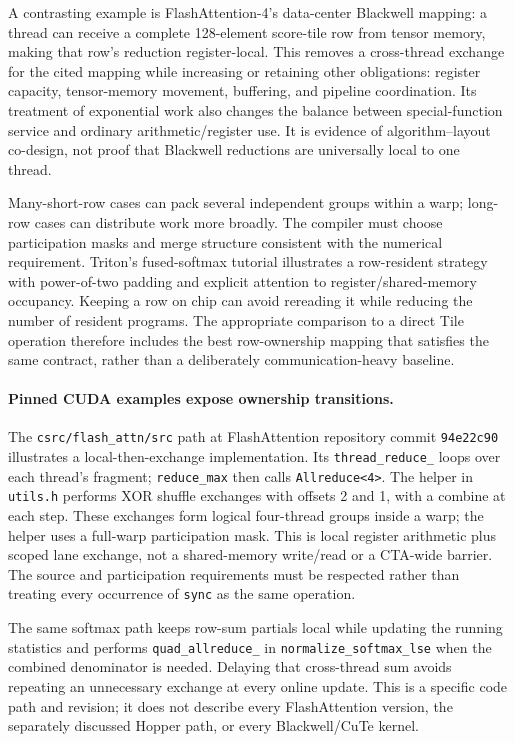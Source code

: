 A contrasting example is FlashAttention-4's data-center Blackwell mapping: a thread can receive a complete 128-element score-tile row from tensor memory, making that row's reduction register-local. This removes a cross-thread exchange for the cited mapping while increasing or retaining other obligations: register capacity, tensor-memory movement, buffering, and pipeline coordination. Its treatment of exponential work also changes the balance between special-function service and ordinary arithmetic/register use. It is evidence of algorithm--layout co-design, not proof that Blackwell reductions are universally local to one thread.~\citep{u005-flash4}

Many-short-row cases can pack several independent groups within a warp; long-row cases can distribute work more broadly. The compiler must choose participation masks and merge structure consistent with the numerical requirement. Triton's fused-softmax tutorial illustrates a row-resident strategy with power-of-two padding and explicit attention to register/shared-memory occupancy. Keeping a row on chip can avoid rereading it while reducing the number of resident programs. The appropriate comparison to a direct Tile operation therefore includes the best row-ownership mapping that satisfies the same contract, rather than a deliberately communication-heavy baseline.~\citep{u005-triton-softmax}

\paragraph{Pinned CUDA examples expose ownership transitions.}
The \texttt{csrc/flash\_attn/src} path at FlashAttention repository commit \texttt{94e22c90} illustrates a local-then-exchange implementation. Its \texttt{thread\_reduce\_} loops over each thread's fragment; \texttt{reduce\_max} then calls \texttt{Allreduce<4>}. The helper in \texttt{utils.h} performs XOR shuffle exchanges with offsets 2 and 1, with a combine at each step. These exchanges form logical four-thread groups inside a warp; the helper uses a full-warp participation mask. This is local register arithmetic plus scoped lane exchange, not a shared-memory write/read or a CTA-wide barrier. The source and participation requirements must be respected rather than treating every occurrence of \texttt{sync} as the same operation.~\citep{u005-fa-softmax-pinned,u005-fa-utils-pinned}

The same softmax path keeps row-sum partials local while updating the running statistics and performs \texttt{quad\_allreduce\_} in \texttt{normalize\_softmax\_lse} when the combined denominator is needed. Delaying that cross-thread sum avoids repeating an unnecessary exchange at every online update. This is a specific code path and revision; it does not describe every FlashAttention version, the separately discussed Hopper path, or every Blackwell/CuTe kernel.~\citep{u005-fa-softmax-pinned}

